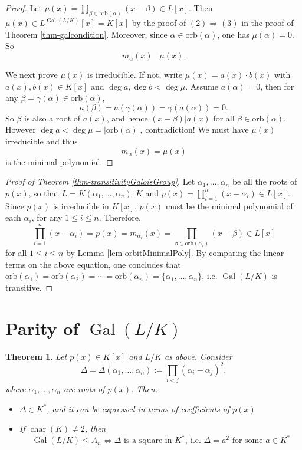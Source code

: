 \documentclass[11pt]{book}
\newtheorem{theorem}{Theorem}[section]
\begin{document}
\begin{proof}
    Let $\mu(x)=\prod_{\beta\in \mathrm{orb}(\alpha)}(x-\beta)\in L[x]$. Then $\mu(x)\in L^{\operatorname{Gal}(L/K)}[x]=K[x]$ by the proof of $(2) \Rightarrow (3)$ in the proof of Theorem \ref{thm-galcondition}. Moreover, since $\alpha \in \mathrm{orb}(\alpha)$, one has $\mu(\alpha)=0$. So 
    $$m_{\alpha}(x)\mid \mu(x).$$ 
    
    We next prove $\mu(x)$ is irreducible. If not, write $\mu(x)=a(x)\cdot b(x)$ with $a(x), b(x)\in K[x]$ and $\deg a, \deg b<\deg \mu$. Assume $a(\alpha)=0$, then for any $\beta=\gamma(\alpha)\in \mathrm{orb}(\alpha)$, 
    \[a(\beta)=a(\gamma(\alpha))=\gamma(a(\alpha))=0.\]
    So $\beta$ is also a root of $a(x)$, and hence $(x-\beta) | a(x)$ for all $\beta \in \mathrm{orb}(\alpha)$.
    However $\deg a<\deg \mu=\left| \mathrm{orb}(\alpha) \right| $, contradiction! 
    We must have $\mu(x)$ irreducible and thus 
    $$m_{\alpha}(x) = \mu(x)$$ 
    is the minimal polynomial. 
\end{proof}

\begin{proof}[Proof of Theorem \ref{thm-transitivityGaloisGroup}]
    Let $\alpha_{1},\dots, \alpha_{n}$ be all the roots of $p(x)$, so that
    $L=K(\alpha_{1},\dots, \alpha_{n}):K$ and $p(x)=\prod_{i=1}^{n}(x-\alpha_{i})\in L[x]$. 
    Since $p(x)$ is irreducible in $K[x]$, $p(x)$ must be the minimal polynomial of each $\alpha_{i}$, for any $1\leq i\leq n$. Therefore, 
    $$\prod_{i=1}^{n}(x-\alpha_{i}) = p(x) = m_{\alpha_i}(x) = \prod_{\beta\in \mathrm{orb}(\alpha_i)}(x-\beta)\in L[x]$$
    for all $1 \leq i \leq n$ by Lemma \ref{lem-orbitMinimalPoly}. By comparing the linear terms on the above equation, one concludes that $\mathrm{orb}(\alpha_{1})=\mathrm{orb}(\alpha_{2})=\cdots=\mathrm{orb}(\alpha_{n}) = \{\alpha_1, \dots, \alpha_n\}$, i.e. $\operatorname{Gal}(L/K)$ is transitive.
\end{proof}

\section{Parity of $\operatorname{Gal}(L/K)$}
\begin{theorem} \label{thm-discrim}
Let $ p(x) \in K[x] $ and $ L/K $ as above. Consider 
$$
\Delta = \Delta(\alpha_1,\ldots,\alpha_n) := \prod_{i<j} (\alpha_i - \alpha_j)^2,
$$ 
where $ \alpha_1,\ldots,\alpha_n $ are roots of $ p(x) $. Then:
\begin{itemize}
    \item $ \Delta \in K^* $, and it can be expressed in terms of coefficients of $ p(x) $
    \item If $ \operatorname{char}(K) \neq 2 $, then
    $$
    \operatorname{Gal}(L/K) \leq A_n \iff \Delta \text{ is a square in } K^*,\ \text{i.e. }\Delta = a^2 \text{ for some } a \in K^*
    $$
\end{itemize}
\end{theorem}
\end{document}
